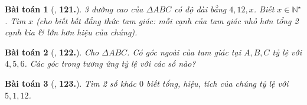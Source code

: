 \documentclass{article}
\numberwithin{equation}{section}
\newtheorem{baitoan}{Bài toán}
\begin{document}
\begin{baitoan}[\cite{Binh_Toan_7_tap_1}, \textbf{121.}]
	3 đường cao của $\Delta ABC$ có độ dài bằng $4,12,x$. Biết $x\in\mathbb{N}^\star$. Tìm $x$ (cho biết \emph{bất đẳng thức tam giác}: mỗi cạnh của tam giác nhỏ hơn tổng 2 cạnh kia \& lớn hơn hiệu của chúng).
\end{baitoan}

\begin{baitoan}[\cite{Binh_Toan_7_tap_1}, \textbf{122.}]
	Cho $\Delta ABC$. Có góc ngoài của tam giác tại $A,B,C$ tỷ lệ với $4,5,6$. Các góc trong tương ứng tỷ lệ với các số nào?
\end{baitoan}

\begin{baitoan}[\cite{Binh_Toan_7_tap_1}, \textbf{123.}]
	Tìm 2 số khác $0$ biết tổng, hiệu, tích của chúng tỷ lệ với $5,1,12$.
\end{baitoan}


\printbibliography[heading=bibintoc]
	
\end{document}
